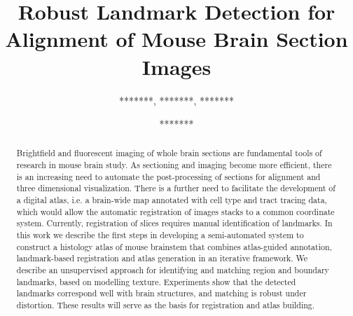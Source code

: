 \documentclass{llncs}
\begin{document}
\textfloatsep=5pt
\intextsep=3pt

%
%
\title{Robust Landmark Detection for Alignment of Mouse Brain Section Images}
%
%
\author{*******, *******, ******* \and *******}
%
%
%
\institute{************************
\and ************************
\and ************************}

\maketitle              %
\begin{abstract}

Brightfield and fluorescent imaging of whole brain sections are
fundamental tools of research in mouse brain study.  As
sectioning and imaging become more efficient, there is an increasing
need to automate the post-processing of sections for alignment and
three dimensional visualization. There is a further need to facilitate
the development of a digital atlas, i.e. a brain-wide map annotated
with cell type and tract tracing data, which would allow the automatic
registration of images stacks to a common coordinate
system. Currently, registration of slices requires manual
identification of landmarks. In this work we describe the first steps
in developing a semi-automated system to construct a histology atlas
of mouse brainstem that combines atlas-guided annotation,
landmark-based registration and atlas generation in an iterative
framework.
We describe an unsupervised approach for identifying and matching
region and boundary landmarks, based on modelling texture. Experiments
show that the detected landmarks correspond well with brain
structures, and matching is robust under distortion. These results
will serve as the basis for registration and atlas building.


\end{abstract}
%
\end{document}
